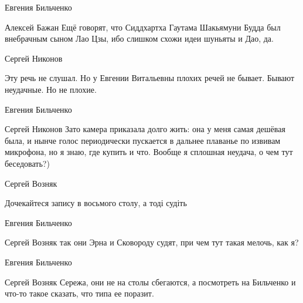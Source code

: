 Евгения Бильченко

Алексей Бажан Ещё говорят, что Сиддхартха Гаутама Шакьямуни Будда был
внебрачным сыном Лао Цзы, ибо слишком схожи идеи шуньяты и Дао, да.

Сергей Никонов

Эту речь не слушал. Но у Евгении Витальевны плохих речей не бывает. Бывают
неудачные. Но не плохие.

Евгения Бильченко

Сергей Никонов Зато камера приказала долго жить: она у меня самая дешёвая была,
и нынче голос периодически пускается в дальнее плаванье по извивам микрофона,
но я знаю, где купить и что. Вообще я сплошная неудача, о чем тут беседовать?)

Сергей Возняк

Дочекайтеся запису в восьмого столу, а тоді судіть

Евгения Бильченко

Сергей Возняк так они Эрна и Сковороду судят, при чем тут такая мелочь, как я?

Евгения Бильченко

Сергей Возняк Сережа, они не на столы сбегаются, а посмотреть на Бильченко и что-то такое сказать, что типа ее поразит.
